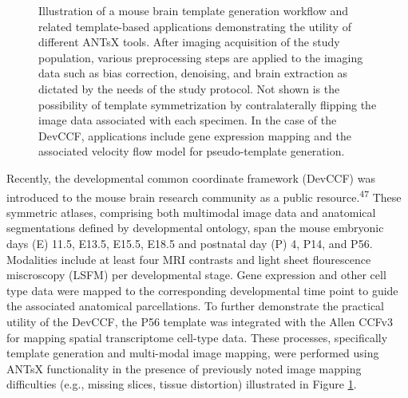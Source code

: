 \documentclass[
  12pt,
]{article}
\begin{document}
\begin{figure}[!htb]
\centering
{}%
\caption{Illustration of a mouse brain template generation workflow and 
related template-based applications demonstrating the utility of different 
ANTsX tools.  After imaging acquisition of the study population, various 
preprocessing steps are applied to the imaging data such as bias correction,
denoising, and brain extraction as dictated by the needs of the study 
protocol.  Not shown is the possibility of template symmetrization by 
contralaterally flipping the image data associated with each specimen.  
In the case of the DevCCF, applications include gene expression mapping 
and the associated velocity flow model for pseudo-template generation.}
\label{fig:pipeline}
\end{figure}

Recently, the developmental common coordinate framework (DevCCF) was
introduced to the mouse brain research community as a public
resource.\textsuperscript{47} These symmetric atlases, comprising both
multimodal image data and anatomical segmentations defined by
developmental ontology, span the mouse embryonic days (E) 11.5, E13.5,
E15.5, E18.5 and postnatal day (P) 4, P14, and P56. Modalities include
at least four MRI contrasts and light sheet flourescence miscroscopy
(LSFM) per developmental stage. Gene expression and other cell type data
were mapped to the corresponding developmental time point to guide the
associated anatomical parcellations. To further demonstrate the
practical utility of the DevCCF, the P56 template was integrated with
the Allen CCFv3 for mapping spatial transcriptome cell-type data. These
processes, specifically template generation and multi-modal image
mapping, were performed using ANTsX functionality in the presence of
previously noted image mapping difficulties (e.g., missing slices,
tissue distortion) illustrated in Figure \ref{fig:pipeline}.
\end{document}
